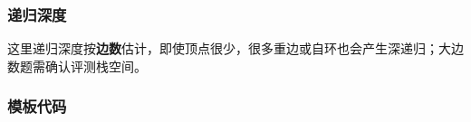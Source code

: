 \subsubsection*{递归深度}
这里递归深度按\textbf{边数}估计，即使顶点很少，很多重边或自环也会产生深递归；大边数题需确认评测栈空间。

\subsubsection*{模板代码}
